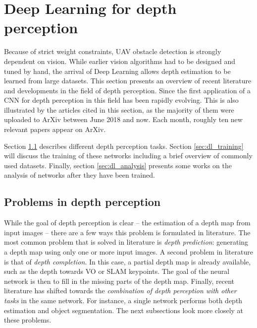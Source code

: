 \section{Deep Learning for depth perception}
\label{sec:depthest}
Because of strict weight constraints, \ac{UAV} obstacle detection is strongly dependent on vision.
While earlier vision algorithms had to be designed and tuned by hand, the arrival of Deep Learning allows depth estimation to be learned from large datasets.
This section presents an overview of recent literature and developments in the field of depth perception.
Since the first application of a \acf{CNN} for depth perception in \citeyear{Eigen2014} \cite{Eigen2014} this field has been rapidly evolving.
This is also illustrated by the articles cited in this section, as the majority of them were uploaded to ArXiv between June 2018 and now.
Each month, roughly ten new relevant papers appear on ArXiv.

Section \ref{sec:dl_problems} describes different depth perception tasks.
Section \ref{sec:dl_training} will discuss the training of these networks including a brief overview of commonly used datasets.
Finally, section \ref{sec:dl_analysis} presents some works on the analysis of networks after they have been trained.


\subsection{Problems in depth perception}
\label{sec:dl_problems}
While the goal of depth perception is clear -- the estimation of a depth map from input images -- there are a few ways this problem is formulated in literature.
The most common problem that is solved in literature is \emph{depth prediction}: generating a depth map using only one or more input images.
A second problem in literature is that of \emph{depth completion}.
In this case, a partial depth map is already available, such as the depth towards \ac{VO} or \ac{SLAM} keypoints.
The goal of the neural network is then to fill in the missing parts of the depth map.
Finally, recent literature has shifted towards the \emph{combination of depth perception with other tasks} in the same network.
For instance, a single network performs both depth estimation and object segmentation.
The next subsections look more closely at these problems.

